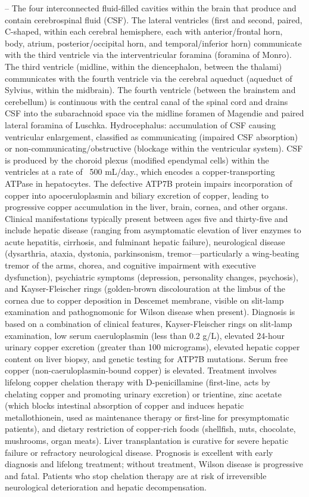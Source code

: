 -- The four interconnected fluid-filled cavities within the brain that produce and contain cerebrospinal fluid (CSF). The lateral ventricles (first and second, paired, C-shaped, within each cerebral hemisphere, each with anterior/frontal horn, body, atrium, posterior/occipital horn, and temporal/inferior horn) communicate with the third ventricle via the interventricular foramina (foramina of Monro). The third ventricle (midline, within the diencephalon, between the thalami) communicates with the fourth ventricle via the cerebral aqueduct (aqueduct of Sylvius, within the midbrain). The fourth ventricle (between the brainstem and cerebellum) is continuous with the central canal of the spinal cord and drains CSF into the subarachnoid space via the midline foramen of Magendie and paired lateral foramina of Luschka. Hydrocephalus: accumulation of CSF causing ventricular enlargement, classified as communicating (impaired CSF absorption) or non-communicating/obstructive (blockage within the ventricular system). CSF is produced by the choroid plexus (modified ependymal cells) within the ventricles at a rate of ~500 mL/day., which encodes a copper-transporting ATPase in hepatocytes. The defective ATP7B protein impairs incorporation of copper into apoceruloplasmin and biliary excretion of copper, leading to progressive copper accumulation in the liver, brain, cornea, and other organs. Clinical manifestations typically present between ages five and thirty-five and include hepatic disease (ranging from asymptomatic elevation of liver enzymes to acute hepatitis, cirrhosis, and fulminant hepatic failure), neurological disease (dysarthria, ataxia, dystonia, parkinsonism, tremor—particularly a wing-beating tremor of the arms, chorea, and cognitive impairment with executive dysfunction), psychiatric symptoms (depression, personality changes, psychosis), and Kayser-Fleischer rings (golden-brown discolouration at the limbus of the cornea due to copper deposition in Descemet membrane, visible on slit-lamp examination and pathognomonic for Wilson disease when present). Diagnosis is based on a combination of clinical features, Kayser-Fleischer rings on slit-lamp examination, low serum caeruloplasmin (less than 0.2 g/L), elevated 24-hour urinary copper excretion (greater than 100 micrograms), elevated hepatic copper content on liver biopsy, and genetic testing for ATP7B mutations. Serum free copper (non-caeruloplasmin-bound copper) is elevated. Treatment involves lifelong copper chelation therapy with D-penicillamine (first-line, acts by chelating copper and promoting urinary excretion) or trientine, zinc acetate (which blocks intestinal absorption of copper and induces hepatic metallothionein, used as maintenance therapy or first-line for presymptomatic patients), and dietary restriction of copper-rich foods (shellfish, nuts, chocolate, mushrooms, organ meats). Liver transplantation is curative for severe hepatic failure or refractory neurological disease. Prognosis is excellent with early diagnosis and lifelong treatment; without treatment, Wilson disease is progressive and fatal. Patients who stop chelation therapy are at risk of irreversible neurological deterioration and hepatic decompensation.


